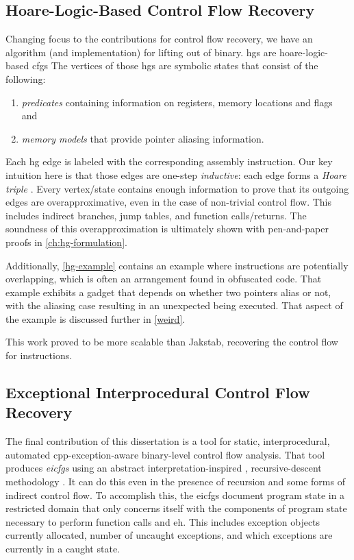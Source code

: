 \subsection{Hoare-Logic-Based Control Flow Recovery}
Changing focus to the contributions for control flow recovery, we have an algorithm (and implementation) for lifting  out of  binary.
\Acp{hg} are \gls{hoare-logic}-based \acp{cfg}
The vertices of those \acp{hg} are symbolic states that consist of the following:
\begin{enumerate}
  \item \emph{predicates} containing information on registers, memory locations and flags and
  \item \emph{memory models} that provide pointer aliasing information.
\end{enumerate}
Each \ac{hg} edge is labeled with the corresponding assembly instruction.
Our key intuition here is that those edges are one-step \emph{inductive}:
each edge forms a \emph{Hoare triple}
\autocite{hoare1969axiomatic}.
Every vertex/state contains enough information to prove that its outgoing edges are overapproximative,
even in the case of non-trivial control flow.
This includes indirect branches, jump tables, and function calls/returns.
The soundness of this overapproximation is ultimately shown with pen-and-paper proofs in \cref{ch:hg-formulation}.

Additionally, \cref{hg-example} contains an example where instructions are potentially overlapping, which is often an arrangement found in obfuscated code.
That example exhibits a  gadget that depends on whether two pointers alias or not, with the aliasing case resulting in an unexpected  being executed. That aspect of the example is discussed further in \cref{weird}.

This work proved to be more scalable than Jakstab, recovering the control flow for  instructions.

\subsection{Exceptional Interprocedural Control Flow Recovery}
The final contribution of this dissertation is a tool for static, interprocedural, automated \gls{cpp}-exception-aware \autocite{cxxEhAbi} binary-level control flow analysis.
That tool produces \emph{\acp{eicfg}} using an abstract interpretation-inspired \autocite{cousot1976static,cousot1977abstract}, recursive-descent methodology \autocite{nagy2022bobw}.
It can do this even in the presence of recursion and some forms of indirect control flow.
To accomplish this, the \acp{eicfg} document program state in a restricted domain that only concerns itself with the components of program state necessary to perform function calls and \ac{eh}.
This includes exception objects currently allocated, number of uncaught exceptions, and which exceptions are currently in a caught state.

